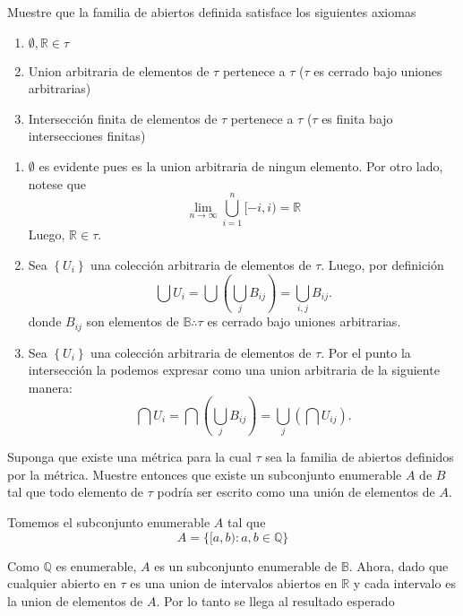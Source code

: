 \documentclass[12pt]{article}
\newenvironment{ex}[2][Ejercicio]{\begin{trivlist}
\item[\hskip \labelsep {\bfseries #1}\hskip \labelsep {\bfseries #2.}]}{\end{trivlist}}
\newenvironment{sol}[1][Solución]{\begin{trivlist}
\item[\hskip \labelsep {\bfseries #1:}]}{\end{trivlist}}
\begin{document}
\begin{ex}{4.1}
	Muestre que la familia de abiertos definida satisface los siguientes axiomas
	\begin{enumerate}
		\item[(a)] $\emptyset, \mathbb{R} \in \tau$
		\item[(b)] Union arbitraria de elementos de $\tau$ pertenece a $\tau$ ($\tau$ es cerrado bajo uniones arbitrarias)
		\item[(c)] Intersección finita de elementos de $\tau$ pertenece a $\tau$ ($\tau$ es finita bajo intersecciones finitas)
	\end{enumerate}
\end{ex}
\begin{sol}
	\begin{enumerate}
		\item[(a)] $\emptyset$ es evidente pues es la union arbitraria de ningun elemento. Por otro lado, notese que $$\lim_{n\rightarrow\infty} \bigcup_{i=1}^{n}[-i,i)=\mathbb{R}$$ Luego, $\mathbb{R}\in\tau$.
		\item[(b)] Sea $\left\{U_i\right\}$ una colección arbitraria de elementos de $\tau$. Luego, por definición $$\bigcup U_i = \bigcup \left(\bigcup_{j} B_{ij}\right) = \bigcup_{i,j} B_{ij}.$$ donde $B_{ij}$ son elementos de $\mathbb{B}\therefore\tau$ es cerrado bajo uniones arbitrarias.
		\item[(c)] Sea $\left\{U_i\right\}$ una colección arbitraria de elementos de $\tau$. Por el punto la intersección la podemos expresar como una union arbitraria de la siguiente manera:
\begin{equation*}
   \bigcap U_i = \bigcap \left(\bigcup_{j} B_{ij}\right) = \bigcup_{j} \left(\bigcap U_{ij}\right).
\end{equation*}
	\end{enumerate}
\end{sol}
\begin{ex}{4.2}
	Suponga que existe una métrica para la cual $\tau$ sea la familia de abiertos definidos por la métrica. Muestre entonces que existe un subconjunto enumerable $A$ de $B$ tal que todo elemento de $\tau$ podría ser escrito como una unión de elementos de $A$.
\end{ex}
\begin{sol}
	Tomemos el subconjunto enumerable $A$ tal que $$
    A = \{[a,b) : a,b \in \mathbb{Q}\}  
	$$

	Como $\mathbb{Q}$ es enumerable, $A$ es un subconjunto enumerable de $\mathbb{B}$. Ahora, dado que cualquier abierto en $\tau$ es una union de intervalos abiertos en $\mathbb{R}$ y cada intervalo es la union de elementos de $A$. Por lo tanto se llega al resultado esperado
\end{sol}
\end{document}
